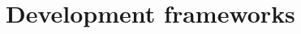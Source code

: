 \documentclass[../ITD.tex]{subfiles}
\begin{document}
    \chapter{Development frameworks}\label{ch: development-frameworks}
\end{document}
